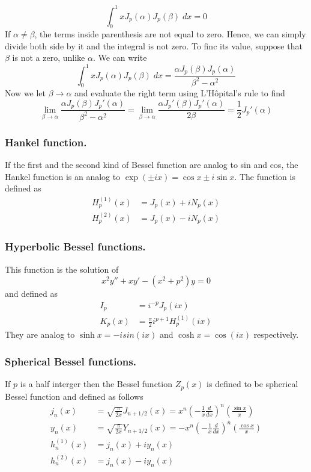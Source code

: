 \documentclass[../main.tex]{subfiles}
\begin{document}
\begin{equation*}
    \int_{0}^{1}xJ_p(\alpha)J_p(\beta)\;dx=0
\end{equation*}
If $\alpha\neq\beta$, the terms inside parenthesis are not equal to zero. Hence, we can simply divide both side by it and the integral is not zero. To finc its value, suppose that $\beta$ is not a zero, unlike $\alpha$. We can write 
\begin{equation*}
    \int_{0}^{1}xJ_p(\alpha)J_p(\beta)\;dx=\frac{\alpha J_p(\beta)J_p(\alpha)}{\beta^2-\alpha^2}
\end{equation*}
Now we let $\beta\rightarrow\alpha$ and evaluate the right term using  L'Hôpital's rule to find 
\begin{equation*}
    \lim_{\beta\rightarrow\alpha}\frac{\alpha J_p(\beta)J_p'(\alpha)}{\beta^2-\alpha^2} =\lim_{\beta\rightarrow\alpha}\frac{\alpha J_p'(\beta)J_p'(\alpha)}{2\beta}=\frac{1}{2}J_p'(\alpha)
\end{equation*}


\subsubsection*{Hankel function.} If the first and the second kind of Bessel function are analog to sin and cos, the Hankel function is an analog to $\exp(\pm ix)=\cos x \pm i\sin x$. The function is defined as  
\begin{align*}
    H_p^{(1)}(x)&=J_p(x)+iN_p(x)\\
    H_p^{(2)}(x)&=J_p(x)-iN_p(x)
\end{align*}

\subsubsection*{Hyperbolic Bessel functions.} This function is the solution of 
\begin{equation*}
    x^2y''+xy'-(x^2+p^2)y=0
\end{equation*}
and defined as 
\begin{align*}
    I_p&=i^{-p}J_p(ix)\\
    K_p(x)&=\frac{\pi}{2}i^{p+1}H_p^{(1)}(ix)
\end{align*}
They are analog to $\sinh x= -isin (ix)$ and $\cosh x=\cos (ix)$ respectively.

\subsubsection*{Spherical Bessel functions.} If $p$ is a half interger
then the Bessel function $Z_p(x)$ is defined to be spherical Bessel function and defined as follows
\begin{align*}
    j_n(x)&=\sqrt{\frac{\pi}{2x}}J_{n+1/2}(x)=x^n\left(-\frac{1}{x}\frac{d}{dx}\right)^n\left(\frac{\sin x}{x}\right)\\
    y_n(x)&=\sqrt{\frac{\pi}{2x}}Y_{n+1/2}(x)=-x^n\left(-\frac{1}{x}\frac{d}{dx}\right)^n\left(\frac{\cos x}{x}\right)\\
    h_n^{(1)}(x)&=j_n(x)+iy_n(x)\\
    h_n^{(2)}(x)&=j_n(x)-iy_n(x)
\end{align*}
\end{document}
